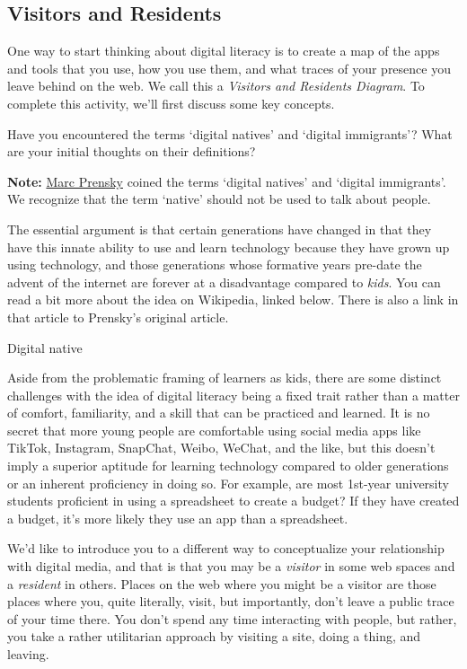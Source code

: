 \documentclass[
]{book}
\theoremstyle{definition}
\theoremstyle{definition}
\theoremstyle{definition}
\theoremstyle{definition}
\theoremstyle{remark}
\begin{document}
\hypertarget{visitors-and-residents}{%
\subsection{Visitors and Residents}\label{visitors-and-residents}}

One way to start thinking about digital literacy is to create a map of the apps and tools that you use, how you use them, and what traces of your presence you leave behind on the web. We call this a \emph{Visitors and Residents Diagram}. To complete this activity, we'll first discuss some key concepts.

Have you encountered the terms `digital natives' and `digital immigrants'? What are your initial thoughts on their definitions?

\begin{caution}
\textbf{Note:} \href{https://marcprensky.com/}{Marc Prensky} coined the terms `digital natives' and `digital immigrants'. We recognize that the term `native' should not be used to talk about people.
\end{caution}

The essential argument is that certain generations have changed in that they have this innate ability to use and learn technology because they have grown up using technology, and those generations whose formative years pre-date the advent of the internet are forever at a disadvantage compared to \emph{kids}. You can read a bit more about the idea on Wikipedia, linked below. There is also a link in that article to Prensky's original article.

Digital native

Aside from the problematic framing of learners as kids, there are some distinct challenges with the idea of digital literacy being a fixed trait rather than a matter of comfort, familiarity, and a skill that can be practiced and learned. It is no secret that more young people are comfortable using social media apps like TikTok, Instagram, SnapChat, Weibo, WeChat, and the like, but this doesn't imply a superior aptitude for learning technology compared to older generations or an inherent proficiency in doing so. For example, are most 1st-year university students proficient in using a spreadsheet to create a budget? If they have created a budget, it's more likely they use an app than a spreadsheet.

We'd like to introduce you to a different way to conceptualize your relationship with digital media, and that is that you may be a \emph{visitor} in some web spaces and a \emph{resident} in others. Places on the web where you might be a visitor are those places where you, quite literally, visit, but importantly, don't leave a public trace of your time there. You don't spend any time interacting with people, but rather, you take a rather utilitarian approach by visiting a site, doing a thing, and leaving.
\end{document}

